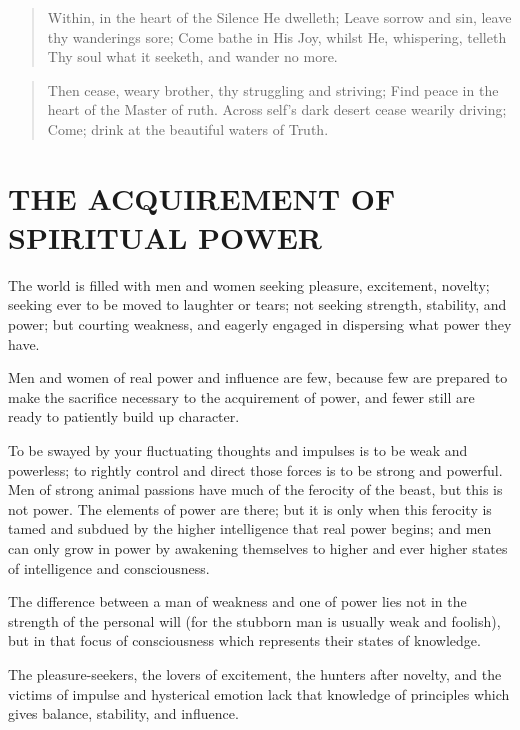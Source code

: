 \documentclass[12pt,oneside]{scrbook}
\begin{document}
  \begin{quote}
  Within, in the heart of the Silence He dwelleth; Leave sorrow and sin,
  leave thy wanderings sore; Come bathe in His Joy, whilst He, whispering,
  telleth Thy soul what it seeketh, and wander no more.
  \end{quote}
  
  \begin{quote}
  Then cease, weary brother, thy struggling and striving; Find peace in
  the heart of the Master of ruth. Across self's dark desert cease wearily
  driving; Come; drink at the beautiful waters of Truth.
  \end{quote}
  
  \section{THE ACQUIREMENT OF SPIRITUAL
  POWER}\label{the-acquirement-of-spiritual-power}
  
  The world is filled with men and women seeking pleasure, excitement,
  novelty; seeking ever to be moved to laughter or tears; not seeking
  strength, stability, and power; but courting weakness, and eagerly
  engaged in dispersing what power they have.
  
  Men and women of real power and influence are few, because few are
  prepared to make the sacrifice necessary to the acquirement of power,
  and fewer still are ready to patiently build up character.
  
  To be swayed by your fluctuating thoughts and impulses is to be weak and
  powerless; to rightly control and direct those forces is to be strong
  and powerful. Men of strong animal passions have much of the ferocity of
  the beast, but this is not power. The elements of power are there; but
  it is only when this ferocity is tamed and subdued by the higher
  intelligence that real power begins; and men can only grow in power by
  awakening themselves to higher and ever higher states of intelligence
  and consciousness.
  
  The difference between a man of weakness and one of power lies not in
  the strength of the personal will (for the stubborn man is usually weak
  and foolish), but in that focus of consciousness which represents their
  states of knowledge.
  
  The pleasure-seekers, the lovers of excitement, the hunters after
  novelty, and the victims of impulse and hysterical emotion lack that
  knowledge of principles which gives balance, stability, and influence.
  
\end{document}
